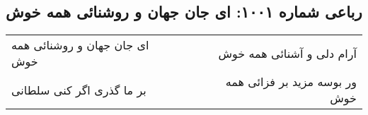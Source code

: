 \begin{center}
\section*{رباعی شماره ۱۰۰۱: ای جان جهان و روشنائی همه خوش}
\label{sec:1001}
\begin{longtable}{l p{0.5cm} r}
ای جان جهان و روشنائی همه خوش
&&
آرام دلی و آشنائی همه خوش
\\
بر ما گذری اگر کنی سلطانی
&&
ور بوسه مزید بر فزائی همه خوش
\\
\end{longtable}
\end{center}
